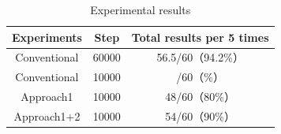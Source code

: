\begin{itemize}
  \vspace{0.5cm}

  \begin{table}[hbtp]
    \caption{Experimental results}
    \label{table:result4}
    \centering
    \begin{tabular}{|c|c|c|}
      \hline
      Experiments & Step & Total results per 5 times\\
      \hline
      Conventional & 60000 & 56.5/60（94.2\%）\\
      \hline
      Conventional & 10000 & /60（\%）\\
      \hline
      Approach1 & 10000 & 48/60（80\%）\\
      \hline
      Approach1+2 & 10000 & 54/60（90\%）\\
      \hline
    \end{tabular}
  \end{table}

\end{itemize}


\newpage
